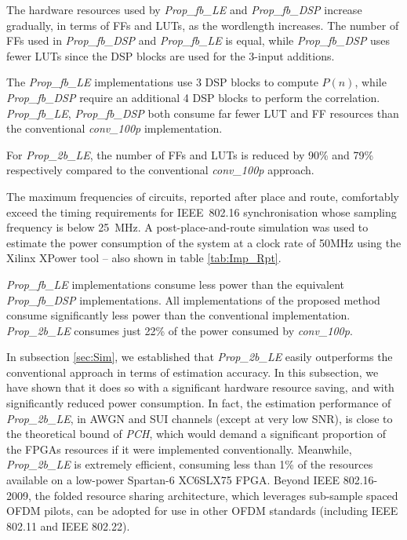 The hardware resources used by \emph{Prop\_fb\_LE} and \emph{Prop\_fb\_DSP} increase gradually, in terms of FFs and LUTs, as the wordlength increases.
The number of FFs used in \emph{Prop\_fb\_DSP} and \emph{Prop\_fb\_LE} is equal, while \emph{Prop\_fb\_DSP} uses fewer LUTs since the DSP blocks are used for the 3-input additions.

The \emph{Prop\_fb\_LE} implementations use 3 DSP blocks to compute $P(n)$, while \emph{Prop\_fb\_DSP} require an additional 4 DSP blocks to perform the correlation.
\emph{Prop\_fb\_LE}, \emph{Prop\_fb\_DSP} both consume far fewer LUT and FF resources than the conventional \emph{conv\_100p} implementation.

For \emph{Prop\_2b\_LE}, the number of FFs and LUTs is reduced by 90\% and 79\% respectively compared to the conventional \emph{conv\_100p} approach.

The maximum frequencies of circuits, reported after place and route, comfortably exceed the timing requirements for IEEE~802.16 synchronisation whose sampling frequency is below 25~MHz.
A post-place-and-route simulation was used to estimate the power consumption of the system at a clock rate of 50{\thinspace}MHz using the Xilinx XPower tool -- also shown in table \ref{tab:Imp_Rpt}.

\emph{Prop\_fb\_LE} implementations consume less power than the equivalent \emph{Prop\_fb\_DSP} implementations.
All implementations of the proposed method consume significantly less power than the conventional implementation.
\emph{Prop\_2b\_LE} consumes just 22\% of the power consumed by \emph{conv\_100p}.

In subsection \ref{sec:Sim}, we established that \emph{Prop\_2b\_LE} easily outperforms the conventional approach in terms of estimation accuracy.
In this subsection, we have shown that it does so with a significant hardware resource saving, and with significantly reduced power consumption.
In fact, the estimation performance of \emph{Prop\_2b\_LE}, in AWGN and SUI channels (except at very low SNR), is close to the theoretical bound of \emph{PCH}, which would demand a significant proportion of the FPGAs resources if it were implemented conventionally.
Meanwhile, \emph{Prop\_2b\_LE} is extremely efficient, consuming less than 1\% of the resources available on a low-power Spartan-6 XC6SLX75 FPGA.
Beyond IEEE 802.16-2009, the folded resource sharing architecture, which leverages sub-sample spaced OFDM pilots, can be adopted for use in other OFDM standards (including IEEE 802.11 and IEEE 802.22).

